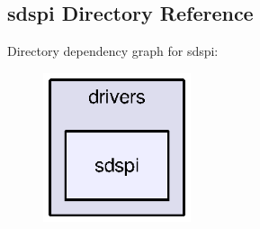 \subsection{sdspi Directory Reference}
\label{dir_a597750ad08f17252718b0c5302c803c}
Directory dependency graph for sdspi\+:
\nopagebreak
\begin{figure}[H]
\begin{center}
\leavevmode
\includegraphics[width=123pt]{dir_a597750ad08f17252718b0c5302c803c_dep}
\end{center}
\end{figure}
